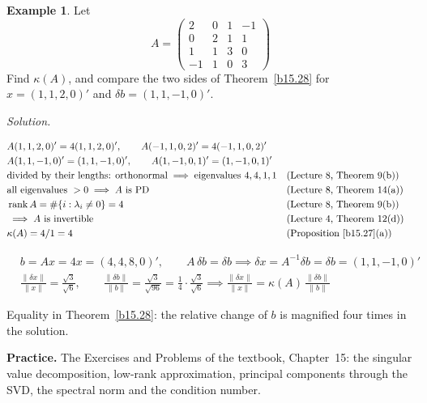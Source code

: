 \documentclass[12pt]{article}
\DeclareMathOperator{\rank}{rank}
\theoremstyle{definition}
\newtheorem{example}[theorem]{Example}
\newcommand{\lec}[1]{Lecture~#1}
\newcommand{\boardtop}{\vspace*{-\abovedisplayskip}}
\begin{document}
\begin{example}\label{b15.29}
Let
\[
A=\begin{pmatrix}2&0&1&-1\\0&2&1&1\\1&1&3&0\\-1&1&0&3\end{pmatrix}
\]
Find \(\kappa(A)\), and compare the two sides of Theorem~\ref{b15.28} for \(x=(1,1,2,0)'\) and \(\delta b=(1,1,-1,0)'\).
\end{example}
\textit{Solution.}
\begin{board}
\boardtop
\begin{align*}
&A(1,1,2,0)'=4(1,1,2,0)',\qquad A(-1,1,0,2)'=4(-1,1,0,2)'\\
&A(1,1,-1,0)'=(1,1,-1,0)',\qquad A(1,-1,0,1)'=(1,-1,0,1)'\\
&\text{divided by their lengths: orthonormal}\implies\text{eigenvalues }4,4,1,1&&\text{(\lec{8}, Theorem~9(b))}\\
&\text{all eigenvalues }>0\implies A\text{ is PD}&&\text{(\lec{8}, Theorem~14(a))}\\
&\rank A=\#\{i:\lambda_i\ne0\}=4&&\text{(\lec{8}, Theorem~9(b))}\\
&\implies A\text{ is invertible}&&\text{(\lec{4}, Theorem~12(d))}\\
&\kappa(A)=4/1=4&&\text{(Proposition~\ref{b15.27}(a))}
\end{align*}
\end{board}
\begin{board}[\(b=Ax\), \(\delta x=A^{-1}\delta b\):]
\boardtop
\begin{align*}
&b=Ax=4x=(4,4,8,0)',\qquad A\,\delta b=\delta b\implies\delta x=A^{-1}\delta b=\delta b=(1,1,-1,0)'\\
&\frac{\lVert\delta x\rVert}{\lVert x\rVert}=\frac{\sqrt3}{\sqrt6},\qquad
\frac{\lVert\delta b\rVert}{\lVert b\rVert}=\frac{\sqrt3}{\sqrt{96}}=\frac14\cdot\frac{\sqrt3}{\sqrt6}
\implies\frac{\lVert\delta x\rVert}{\lVert x\rVert}=\kappa(A)\,\frac{\lVert\delta b\rVert}{\lVert b\rVert}
\end{align*}
\end{board}
Equality in Theorem~\ref{b15.28}: the relative change of \(b\) is magnified four times in the solution.

\bigskip
\textbf{Practice.} The Exercises and Problems of the textbook, Chapter~15: the singular value decomposition, low-rank
approximation, principal components through the SVD, the spectral norm and the condition number.
\end{document}
